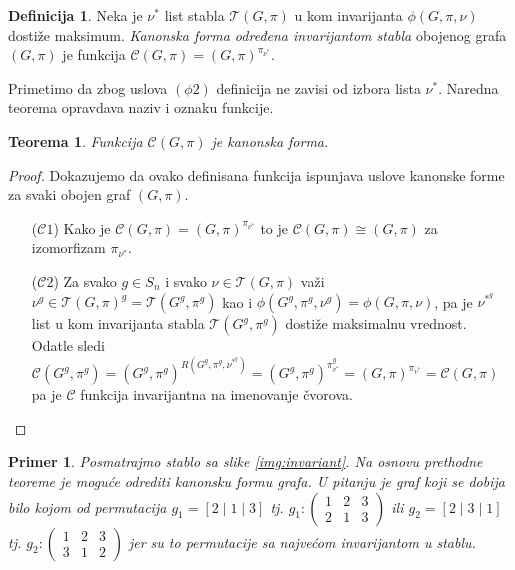 \documentclass[12pt,oneside]{memoir}
\newtheorem{theorem}{Teorema}
\newtheorem{example}{Primer}
\theoremstyle{definition}
\newtheorem*{definition}{Definicija}
\begin{document}
  \begin{definition}
	  Neka je $\nu^*$ list stabla $\mathcal{T}(G, \pi)$ u kom invarijanta
	  $\phi(G, \pi, \nu)$ dostiže maksimum. \emph{Kanonska forma određena
	  invarijantom stabla} obojenog grafa $(G, \pi)$ je funkcija
	  $\mathcal{C}(G, \pi) = (G, \pi)^{\pi_{\nu^*}}$.
  \end{definition}

  Primetimo da zbog uslova $(\phi2)$ definicija ne zavisi od izbora lista
  $\nu^*$. Naredna teorema opravdava naziv i oznaku funkcije.

  \begin{theorem}
	  Funkcija $\mathcal{C}(G, \pi)$ je kanonska forma.
  \end{theorem}

  \begin{proof}
		Dokazujemo da ovako definisana funkcija ispunjava uslove kanonske forme za
		svaki obojen graf $(G, \pi)$.
	  \begin{itemize}
		  \item [($\mathcal{C}1$)] Kako je $\mathcal{C}(G, \pi) = (G,
			  \pi)^{\pi_{\nu^*}}$ to je $\mathcal{C}(G, \pi) \cong (G, \pi)$ za
			  izomorfizam $\pi_{\nu^*}$.
		  \item [($\mathcal{C}2$)] Za svako $g \in S_n$ i svako $\nu \in
			  \mathcal{T}(G, \pi)$ važi $\nu^g \in \mathcal{T}(G, \pi)^g =
			  \mathcal{T}(G^g, \pi^g)$ kao i $\phi(G^g, \pi^g, \nu^g) = \phi(G,
			  \pi, \nu)$, pa je $\nu^*^g$ list u kom invarijanta stabla
			  $\mathcal{T}(G^g, \pi^g)$ dostiže maksimalnu vrednost.  Odatle
			  sledi $\mathcal{C}(G^g, \pi^g) = (G^g, \pi^g)^{R(G^g, \pi^g,
			  \nu^*^g)} = (G^g, \pi^g)^{\pi_{v^*}^g} = (G, \pi)^{\pi_{v^*}} =
			  \mathcal{C}(G, \pi)$ pa je $\mathcal{C}$ funkcija invarijantna na
			  imenovanje čvorova.
	  \end{itemize}
  \end{proof}

	\begin{example}
		Posmatrajmo stablo sa slike \ref{img:invariant}. Na osnovu prethodne
		teoreme je moguće odrediti kanonsku formu grafa. U pitanju je graf koji
		se dobija bilo kojom od permutacija $g_1 = [2 \mid 1 \mid 3]$ tj. $g_1 : \begin{pmatrix} 1 & 2 & 3 \\
		2 & 1 & 3\end{pmatrix}$ ili $g_2 = [2 \mid 3 \mid 1]$ tj. $g_2 : \begin{pmatrix} 1 & 2 & 3 \\ 3 &
		1 & 2 \end{pmatrix}$ jer su to permutacije sa najvećom invarijantom u
		stablu.
	\end{example}
\end{document}
